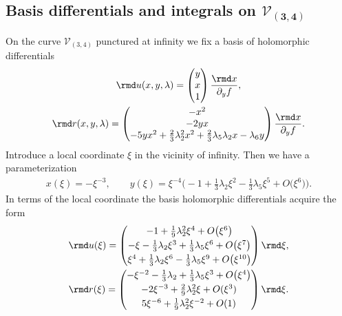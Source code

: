 \subsection[Basis differentials and integrals on $\mathcal{V}_{(3,4)}$]{Basis differentials and integrals on $\boldsymbol{\mathcal{V}_{(3,4)}}$}
On the curve $\mathcal{V}_{(3,4)}$ punctured at infinity we fix a basis of holomorphic differentials
\begin{subequations}\label{Diffs34}
\begin{gather}
\rmd u(x,y,\lambda) = \begin{pmatrix}
 y \\ x \\ 1
 \end{pmatrix} \frac{\rmd x}{\partial_y f},\label{Diff1s34} \\
 \rmd r(x,y,\lambda) = \begin{pmatrix}
 -x^2 \\ -2 y x \\ -5 y x^2 + \frac{2}{3} \lambda_2^2 x^2 + \frac{2}{3} \lambda_5 \lambda_2 x - \lambda_6 y
 \end{pmatrix}\frac{\rmd x}{\partial_y f}. \label{Diff2s34}
\end{gather}
\end{subequations}
Introduce a local coordinate $\xi$ in the vicinity of infinity. Then we have a parameterization
\begin{gather}\label{xyParamC34}
 x(\xi) = -\xi^{-3},\qquad y(\xi) = \xi^{-4}\big({-}1 + \tfrac{1}{3}\lambda_2 \xi^2 - \tfrac{1}{3} \lambda_5 \xi^5 + O\big(\xi^6\big)\big).
\end{gather}
In terms of the local coordinate the basis holomorphic differentials acquire the form
\begin{subequations}
 \begin{gather}\label{C34D1k}
 \rmd u(\xi) =
 \begin{pmatrix}
 -1 + \frac{1}{9} \lambda_2^2 \xi^4 + O\big(\xi^6\big)\vspace{1mm}\\
 -\xi - \frac{1}{3} \lambda_2 \xi^3 + \frac{1}{3} \lambda_5 \xi^6 + O\big(\xi^7\big)\vspace{1mm}\\
 \xi^4 + \frac{1}{3} \lambda_2 \xi^6 - \frac{1}{3} \lambda_5 \xi^{9} + O\big(\xi^{10}\big)
 \end{pmatrix} \rmd \xi,\\
\label{C34D2k}
 \rmd r(\xi) =
 \begin{pmatrix} -\xi^{-2} - \frac{1}{3} \lambda_2 + \frac{1}{3} \lambda_5\xi^3 + O\big(\xi^{4}\big) \vspace{1mm}\\
 - 2 \xi^{-3} + \frac{2}{9}\lambda_2^2 \xi + O(\xi^3)\vspace{1mm}\\
 5 \xi^{-6} + \frac{1}{9} \lambda_2^2 \xi^{-2} + O(1)\end{pmatrix} \rmd \xi.
\end{gather}
\end{subequations}
